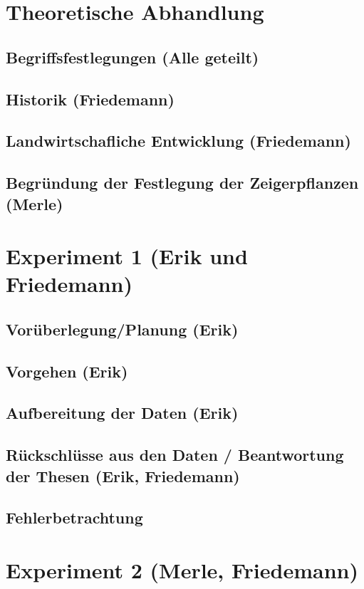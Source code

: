 \chapter{Theoretische Abhandlung}

\section{Begriffsfestlegungen (Alle geteilt)}
\section{Historik (Friedemann)}
\section{Landwirtschafliche Entwicklung (Friedemann)}
\section{Begründung der Festlegung der Zeigerpflanzen (Merle)}

\chapter{Experiment 1 (Erik und Friedemann)}

\section{Vorüberlegung/Planung (Erik)}
\section{Vorgehen (Erik)} %
\section{Aufbereitung der Daten (Erik)}
\section{Rückschlüsse aus den Daten / Beantwortung der Thesen (Erik, Friedemann)}
\section{Fehlerbetrachtung}

\chapter{Experiment 2 (Merle, Friedemann)}

